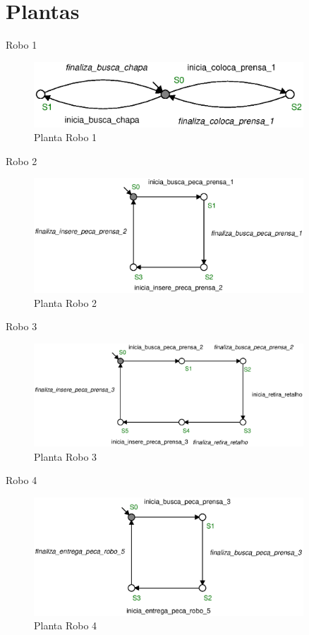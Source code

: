 \section{Plantas}
Robo 1
\lipsum[1]
\begin{figure}[H]%
    \centering
    \includegraphics[width=0.9\textwidth]{imagens/robo_1.eps}
    \caption{Planta Robo 1}\label{fig:robo1}
\end{figure}

Robo 2
\lipsum[2]
\begin{figure}[H]%
    \centering
    \includegraphics[width=0.9\textwidth]{imagens/robo_2.eps}
    \caption{Planta Robo 2}\label{fig:robo2}
\end{figure}

Robo 3
\lipsum[3]
\begin{figure}[H]%
    \centering
    \includegraphics[width=0.9\textwidth]{imagens/robo_3.eps}
    \caption{Planta Robo 3}\label{fig:robo3}
\end{figure}

Robo 4
\lipsum[4]
\begin{figure}[H]%
    \centering
    \includegraphics[width=0.9\textwidth]{imagens/robo_4.eps}
    \caption{Planta Robo 4}\label{fig:robo4}
\end{figure}

